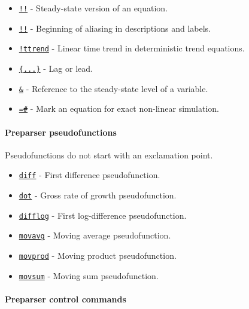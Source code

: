 \begin{itemize}
\itemsep1pt\parskip0pt
\item
  \href{modellang/sstateversion}{\texttt{!!}} - Steady-state version of
  an equation.
\item
  \href{modellang/alias}{\texttt{!!}} - Beginning of aliasing in
  descriptions and labels.
\item
  \href{modellang/ttrend}{\texttt{!ttrend}} - Linear time trend in
  deterministic trend equations.
\item
  \href{modellang/laglead}{\texttt{\{...\}}} - Lag or lead.
\item
  \href{modellang/sstateref}{\texttt{\&}} - Reference to the
  steady-state level of a variable.
\item
  \href{modellang/exactnonlin}{\texttt{=\#}} - Mark an equation for
  exact non-linear simulation.
\end{itemize}

\paragraph{Preparser pseudofunctions}

Pseudofunctions do not start with an exclamation point.

\begin{itemize}
\itemsep1pt\parskip0pt
\item
  \href{modellang/diff}{\texttt{diff}} - First difference
  pseudofunction.
\item
  \href{modellang/dot}{\texttt{dot}} - Gross rate of growth
  pseudofunction.
\item
  \href{modellang/difflog}{\texttt{difflog}} - First log-difference
  pseudofunction.
\item
  \href{modellang/movavg}{\texttt{movavg}} - Moving average
  pseudofunction.
\item
  \href{modellang/movprod}{\texttt{movprod}} - Moving product
  pseudofunction.
\item
  \href{modellang/movsum}{\texttt{movsum}} - Moving sum pseudofunction.
\end{itemize}

\paragraph{Preparser control commands}

